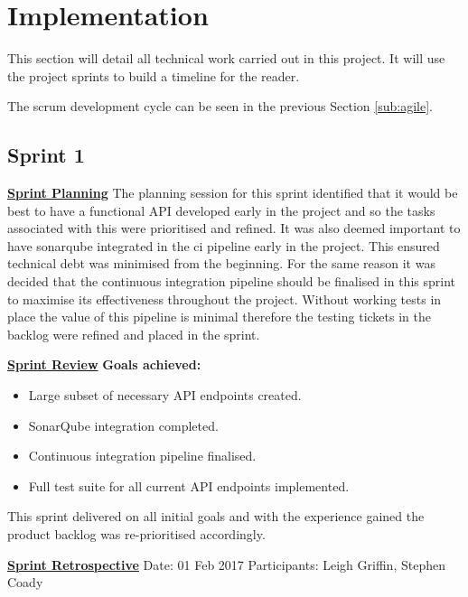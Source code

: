 \section{Implementation}
\label{sec:implementation}
This section will detail all technical work carried out in this project. It will use the project \glspl{sprint} to build a timeline for the reader. 

The scrum development cycle can be seen in the previous Section \ref{sub:agile}.

\subsection{Sprint 1}
\underline{\textbf{Sprint Planning}}\newline
The planning session for this sprint identified that it would be best to have a functional API developed early in the project and so the tasks associated with this were prioritised and refined. It was also deemed important to have \gls{sonarqube} integrated in the \gls{ci} pipeline early in the project. This ensured \gls{technical debt} was minimised from the beginning. For the same reason it was decided that the continuous integration pipeline should be finalised in this sprint to maximise its effectiveness throughout the project. Without working tests in place the value of this pipeline is minimal therefore the testing tickets in the backlog were refined and placed in the sprint.

\underline{\textbf{Sprint Review}}\newline
\textbf{Goals achieved:}
\begin{itemize}
	\item Large subset of necessary API endpoints created.
	\item SonarQube integration completed.
	\item Continuous integration pipeline finalised.
	\item Full test suite for all current API endpoints implemented.
\end{itemize}

This sprint delivered on all initial goals and with the experience gained the product \gls{backlog} was re-prioritised accordingly.

\underline{\textbf{Sprint Retrospective}}\newline
Date: 01 Feb 2017\newline
Participants: Leigh Griffin, Stephen Coady

